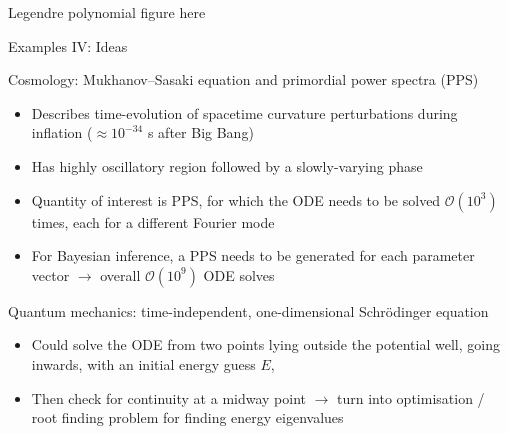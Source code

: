 \documentclass{beamer}
\numberwithin{equation}{theorem}
\begin{document}
\begin{noframe}
    Legendre polynomial figure here
\end{noframe}

\begin{noframe}
    Examples IV: Ideas  \\
    \medskip
    {\footnotesize
    Cosmology: Mukhanov--Sasaki equation and primordial power spectra (PPS)
    \begin{itemize}
    \item{Describes time-evolution of spacetime curvature perturbations during inflation ($\approx 10^{-34}$ s after Big Bang)}
    \item{Has highly oscillatory region followed by a slowly-varying phase}
    \item{Quantity of interest is PPS, for which the ODE needs to be solved $\mathcal{O}(10^3)$ times, each for a different Fourier mode}
    \item{For Bayesian inference, a PPS needs to be generated for each parameter vector $\rightarrow$ overall $\mathcal{O}(10^9)$ ODE solves}
    \end{itemize}
    Quantum mechanics: time-independent, one-dimensional Schr\"{o}dinger equation
    \begin{itemize}
    \item{Could solve the ODE from two points lying outside the potential well, going inwards, with an initial energy guess $E$,}
    \item{Then check for continuity at a midway point $\rightarrow$ turn into optimisation / root finding problem for finding energy eigenvalues}
    \end{itemize}
    }
\end{noframe}
\end{document}
